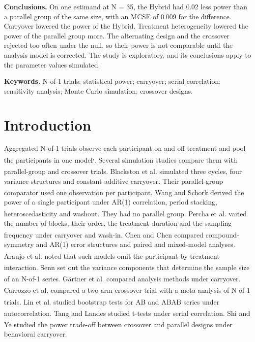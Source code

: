 \documentclass[
  11pt,
]{article}
\begin{document}
\textbf{Conclusions.} On one estimand at N = 35, the Hybrid had 0.02 less power than a parallel group of the same size, with an MCSE of 0.009 for the difference. Carryover lowered the power of the Hybrid. Treatment heterogeneity lowered the power of the parallel group more. The alternating design and the crossover rejected too often under the null, so their power is not comparable until the analysis model is corrected. The study is exploratory, and its conclusions apply to the parameter values simulated.

\textbf{Keywords.} N-of-1 trials; statistical power; carryover; serial correlation; sensitivity analysis; Monte Carlo simulation; crossover designs.

\section{Introduction}\label{introduction}

Aggregated N-of-1 trials observe each participant on and off treatment and pool the participants in one model\textsuperscript{,}. Several simulation studies compare them with parallel-group and crossover trials. Blackston et al.\textsuperscript{} simulated three cycles, four variance structures and constant additive carryover. Their parallel-group comparator used one observation per participant. Wang and Schork\textsuperscript{} derived the power of a single participant under AR(1) correlation, period stacking, heteroscedasticity and washout. They had no parallel group. Percha et al.\textsuperscript{} varied the number of blocks, their order, the treatment duration and the sampling frequency under carryover and wash-in. Chen and Chen\textsuperscript{} compared compound-symmetry and AR(1) error structures and paired and mixed-model analyses. Araujo et al.\textsuperscript{} noted that such models omit the participant-by-treatment interaction. Senn\textsuperscript{} set out the variance components that determine the sample size of an N-of-1 series. Gärtner et al.\textsuperscript{} compared analysis methods under carryover. Carrozzo et al.\textsuperscript{} compared a two-arm crossover trial with a meta-analysis of N-of-1 trials. Lin et al.\textsuperscript{} studied bootstrap tests for AB and ABAB series under autocorrelation. Tang and Landes\textsuperscript{} studied t-tests under serial correlation. Shi and Ye\textsuperscript{} studied the power trade-off between crossover and parallel designs under behavioral carryover.
\end{document}
